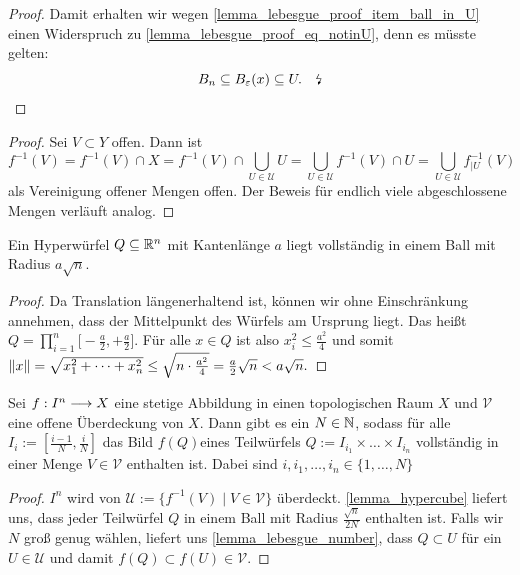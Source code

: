 \begin{proof}
	Damit erhalten wir wegen \ref{lemma_lebesgue_proof_item_ball_in_U} einen Widerspruch zu \cref{lemma_lebesgue_proof_eq_notinU}, denn es müsste gelten:
	\[B_n\subset B_\varepsilon (x)\subseteq U. \quad\text{\lightning}\]

\end{proof}



\begin{proof}
Sei \(V\subset Y\) offen. Dann ist
\[f^{-1} (V) = f^{-1} ( V) \cap X
=  f^{-1} (V) \cap \bigcup_{U\in \mathcal{U}} U 
= \bigcup_{U\in \mathcal{U}} f^{-1}(V) \cap U
= \bigcup_{U\in \mathcal{U}} f_{|U}^{-1}(V)
\]
als Vereinigung offener Mengen offen. Der Beweis für endlich viele abgeschlossene Mengen verläuft analog.
\end{proof}

\begin{lemma} \label{lemma_hypercube} 
	Ein Hyperwürfel \(Q\subset\R^n\) mit Kantenlänge \(a\) liegt vollständig in einem Ball mit Radius \(a\sqrt{n}\). 
\end{lemma}
\begin{proof}
	Da Translation längenerhaltend ist, können wir ohne Einschränkung annehmen, dass der Mittelpunkt des Würfels am Ursprung liegt. Das heißt
	\(Q=\prod_{i=1}^n\big[-\frac{a}{2},+\frac{a}{2}\big]\).
	Für alle \(x\in Q\) ist also \(x_i^2 \leq \frac{a^2}{4}\) und somit
	\(\Norm{x}= \sqrt{x_1^2 + \dots + x_n^2} \leq \sqrt{n\cdot \frac{a^2}{4}} = \frac{a}{2}\sqrt{n} < a\sqrt{n}.\)
\end{proof}
\begin{corollary_weak} 
	Sei \(f:I^n \longarrow X\) eine stetige Abbildung in einen topologischen Raum \(X\) und \(\mathcal{V}\) eine offene Überdeckung von \(X\). Dann gibt es ein 
	\(N\in\N\), sodass für alle 
	\(I_i:=[\frac{i-1}{N}, \frac{i}{N}]\) das Bild \(f(Q)\)eines Teilwürfels \(Q:=I_{i_1}\times \dots \times I_{i_n}\) vollständig in einer Menge \(V\in\mathcal{V}\) enthalten ist. Dabei sind \(i,i_1,\dots,i_n \in \{1,\dots, N\}\)
\end{corollary_weak}
\begin{proof}
	\(I^n\) wird von \(\mathcal{U}:=\{f^{-1}(V)\mid V\in\mathcal{V}\}\) überdeckt. 
	\cref{lemma_hypercube} liefert uns, dass jeder Teilwürfel \(Q\) in einem Ball mit Radius \(\frac{\sqrt{n}}{2N}\) enthalten ist. Falls wir \(N\) groß genug wählen, liefert uns \cref{lemma_lebesgue_number}, dass \(Q\subset U\) für ein \(U\in\mathcal{U}\) und damit \(f(Q)\subset f(U)\in\mathcal{V}.\)
\end{proof}


